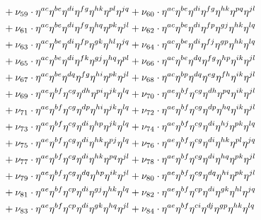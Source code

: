 \documentclass[a4paper,12pt, DIV=14, BCOR=5mm, twoside, headsepline]{scrbook}
\begin{document}
\begin{align}
\begin{alignedat}{2}
& & &\hphantom{=}
+\nu_{59}\cdot\eta^{ac}\eta^{be}\eta^{di}\eta^{fg}\eta^{hk}\eta^{pl}\eta^{jq}+\nu_{60}\cdot\eta^{ac}\eta^{be}\eta^{di}\eta^{fg}\eta^{hk}\eta^{pq}\eta^{jl}\\
& & &\hphantom{=}
+\nu_{61}\cdot\eta^{ac}\eta^{be}\eta^{di}\eta^{fg}\eta^{hq}\eta^{pk}\eta^{jl}+\nu_{62}\cdot\eta^{ac}\eta^{be}\eta^{di}\eta^{fp}\eta^{gj}\eta^{hk}\eta^{lq}\\
& & &\hphantom{=}
+\nu_{63}\cdot\eta^{ac}\eta^{be}\eta^{di}\eta^{fp}\eta^{gk}\eta^{hl}\eta^{jq}+\nu_{64}\cdot\eta^{ac}\eta^{be}\eta^{di}\eta^{fj}\eta^{gp}\eta^{hk}\eta^{lq}\\
& & &\hphantom{=}
+\nu_{65}\cdot\eta^{ac}\eta^{be}\eta^{di}\eta^{fk}\eta^{gj}\eta^{hq}\eta^{pl}+\nu_{66}\cdot\eta^{ac}\eta^{be}\eta^{dq}\eta^{fg}\eta^{hp}\eta^{ik}\eta^{jl}\\
& & &\hphantom{=}
+\nu_{67}\cdot\eta^{ac}\eta^{be}\eta^{dq}\eta^{fg}\eta^{hi}\eta^{pk}\eta^{jl}+\nu_{68}\cdot\eta^{ac}\eta^{bp}\eta^{dq}\eta^{eg}\eta^{fh}\eta^{ik}\eta^{jl}\\
& & &\hphantom{=}
+\nu_{69}\cdot\eta^{ae}\eta^{bf}\eta^{cg}\eta^{dh}\eta^{pi}\eta^{jk}\eta^{lq}+\nu_{70}\cdot\eta^{ae}\eta^{bf}\eta^{cg}\eta^{dh}\eta^{pq}\eta^{ik}\eta^{jl}\\
& & &\hphantom{=}
+\nu_{71}\cdot\eta^{ae}\eta^{bf}\eta^{cg}\eta^{dp}\eta^{hi}\eta^{jk}\eta^{lq}+\nu_{72}\cdot\eta^{ae}\eta^{bf}\eta^{cg}\eta^{dp}\eta^{hq}\eta^{ik}\eta^{jl}\\
& & &\hphantom{=}
+\nu_{73}\cdot\eta^{ae}\eta^{bf}\eta^{cg}\eta^{di}\eta^{hp}\eta^{jk}\eta^{lq}+\nu_{74}\cdot\eta^{ae}\eta^{bf}\eta^{cg}\eta^{di}\eta^{hj}\eta^{pk}\eta^{lq}\\
& & &\hphantom{=}
+\nu_{75}\cdot\eta^{ae}\eta^{bf}\eta^{cg}\eta^{di}\eta^{hk}\eta^{pj}\eta^{lq}+\nu_{76}\cdot\eta^{ae}\eta^{bf}\eta^{cg}\eta^{di}\eta^{hk}\eta^{pl}\eta^{jq}\\
& & &\hphantom{=}
+\nu_{77}\cdot\eta^{ae}\eta^{bf}\eta^{cg}\eta^{di}\eta^{hk}\eta^{pq}\eta^{jl}+\nu_{78}\cdot\eta^{ae}\eta^{bf}\eta^{cg}\eta^{di}\eta^{hq}\eta^{pk}\eta^{jl}\\
& & &\hphantom{=}
+\nu_{79}\cdot\eta^{ae}\eta^{bf}\eta^{cg}\eta^{dq}\eta^{hp}\eta^{ik}\eta^{jl}+\nu_{80}\cdot\eta^{ae}\eta^{bf}\eta^{cg}\eta^{dq}\eta^{hi}\eta^{pk}\eta^{jl}\\
& & &\hphantom{=}
+\nu_{81}\cdot\eta^{ae}\eta^{bf}\eta^{cp}\eta^{di}\eta^{gj}\eta^{hk}\eta^{lq}+\nu_{82}\cdot\eta^{ae}\eta^{bf}\eta^{cp}\eta^{di}\eta^{gk}\eta^{hl}\eta^{jq}\\
& & &\hphantom{=}
+\nu_{83}\cdot\eta^{ae}\eta^{bf}\eta^{cp}\eta^{di}\eta^{gk}\eta^{hq}\eta^{jl}+\nu_{84}\cdot\eta^{ae}\eta^{bf}\eta^{ci}\eta^{dj}\eta^{gp}\eta^{hk}\eta^{lq}\\

\end{alignedat}
\end{align}
\end{document}
